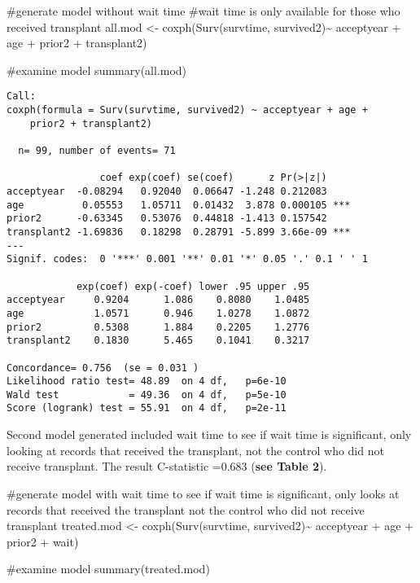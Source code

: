 \documentclass[
  letterpaper,
  DIV=11,
  numbers=noendperiod]{scrreprt}
\newenvironment{Shaded}{\begin{snugshade}}{\end{snugshade}}
\newcommand{\CommentTok}[1]{\textcolor[rgb]{0.37,0.37,0.37}{#1}}
\newcommand{\FunctionTok}[1]{\textcolor[rgb]{0.28,0.35,0.67}{#1}}
\newcommand{\NormalTok}[1]{\textcolor[rgb]{0.00,0.23,0.31}{#1}}
\newcommand{\OtherTok}[1]{\textcolor[rgb]{0.00,0.23,0.31}{#1}}
\newcommand{\SpecialCharTok}[1]{\textcolor[rgb]{0.37,0.37,0.37}{#1}}
\begin{document}
\begin{Shaded}
\begin{Highlighting}[]
\CommentTok{\#generate model without wait time}
\CommentTok{\#wait time is only available for those who received transplant}
\NormalTok{all.mod }\OtherTok{\textless{}{-}} \FunctionTok{coxph}\NormalTok{(}\FunctionTok{Surv}\NormalTok{(survtime, survived2)}\SpecialCharTok{\textasciitilde{}}\NormalTok{ acceptyear }\SpecialCharTok{+}\NormalTok{ age }\SpecialCharTok{+}\NormalTok{ prior2 }\SpecialCharTok{+}\NormalTok{ transplant2)}

\CommentTok{\#examine model}
\FunctionTok{summary}\NormalTok{(all.mod)}
\end{Highlighting}
\end{Shaded}

\begin{verbatim}
Call:
coxph(formula = Surv(survtime, survived2) ~ acceptyear + age + 
    prior2 + transplant2)

  n= 99, number of events= 71 

                coef exp(coef) se(coef)      z Pr(>|z|)    
acceptyear  -0.08294   0.92040  0.06647 -1.248 0.212083    
age          0.05553   1.05711  0.01432  3.878 0.000105 ***
prior2      -0.63345   0.53076  0.44818 -1.413 0.157542    
transplant2 -1.69836   0.18298  0.28791 -5.899 3.66e-09 ***
---
Signif. codes:  0 '***' 0.001 '**' 0.01 '*' 0.05 '.' 0.1 ' ' 1

            exp(coef) exp(-coef) lower .95 upper .95
acceptyear     0.9204      1.086    0.8080    1.0485
age            1.0571      0.946    1.0278    1.0872
prior2         0.5308      1.884    0.2205    1.2776
transplant2    0.1830      5.465    0.1041    0.3217

Concordance= 0.756  (se = 0.031 )
Likelihood ratio test= 48.89  on 4 df,   p=6e-10
Wald test            = 49.36  on 4 df,   p=5e-10
Score (logrank) test = 55.91  on 4 df,   p=2e-11
\end{verbatim}

Second model generated included wait time to see if wait time is
significant, only looking at records that received the transplant, not
the control who did not receive transplant. The result C-statistic
=0.683 (\textbf{see Table 2}).~

\begin{Shaded}
\begin{Highlighting}[]
\CommentTok{\#generate model with wait time to see if wait time is significant, only looks at records that received the transplant not the control who did not receive transplant}
\NormalTok{treated.mod }\OtherTok{\textless{}{-}} \FunctionTok{coxph}\NormalTok{(}\FunctionTok{Surv}\NormalTok{(survtime, survived2)}\SpecialCharTok{\textasciitilde{}}\NormalTok{ acceptyear }\SpecialCharTok{+}\NormalTok{ age }\SpecialCharTok{+}\NormalTok{ prior2 }\SpecialCharTok{+}\NormalTok{ wait)}

\CommentTok{\#examine model}
\FunctionTok{summary}\NormalTok{(treated.mod)}
\end{Highlighting}
\end{Shaded}
\end{document}
